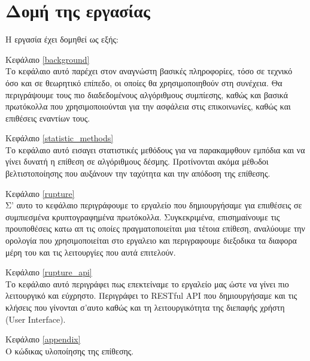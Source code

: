 \section{Δομή της εργασίας}\label{sec:structure}

Η εργασία έχει δομηθεί ως εξής:

 
\begin{description} \item{Κεφάλαιο \ref{background}} \hfill \\

Το κεφάλαιο αυτό παρέχει στον αναγνώστη βασικές πληροφορίες, τόσο σε τεχνικό όσο
και σε θεωρητικό επίπεδο, οι οποίες θα χρησιμοποιηθούν στη συνέχεια.
Θα περιγράψουμε τους πιο διαδεδομένους αλγόριθμους συμπίεσης, καθώς και βασικά
πρωτόκολλα που χρησιμοποιούνται για την ασφάλεια στις επικοινωνίες, καθώς και
επιθέσεις εναντίων τους.\hfill \\

\item{Κεφάλαιο \ref{statistic_methods}} \hfill \\
 
Το κεφάλαιο αυτό εισαγει στατιστικές μεθόδους για να παρακαμφθουν εμπόδια
και να γίνει δυνατή η επίθεση σε αλγόριθμους δέσμης. Προτίνονται ακόμα μέθoδοι
βελτιστοποίησης που αυξάνουν την ταχύτητα και την απόδοση της επίθεσης.


\item{Κεφάλαιο \ref{rupture}} \hfill \\

Σ' αυτο το κεφάλαιο περιγράφουμε το εργαλείο που δημιουργήσαμε για επιιθέσεις
σε συμπιεσμένα κρυπτογραφημένα πρωτόκολλα. Συγκεκριμένα, επισημαίνουμε τις
προυποθέσεις κατω απ τις οποίες πραγματοποιείται μια τέτοια επίθεση, αναλύουμε
την ορολογία που χρησιμοποιείται στο εργαλειο και περιγραφουμε διεξοδικα τα
διαφορα μέρη του και τις λειτουργίες που αυτά επιτελούν.


\item{Κεφάλαιο \ref{rupture_api}} \hfill \\

Το κεφάλαιο αυτό περιγράφει πως επεκτείναμε το εργαλείο μας ώστε να γίνει πιο
λειτουργικό και εύχρηστο. Περιγράφει το RESTful API που δημιουργήσαμε και τις
κλήσεις που γίνονται σ'αυτο καθώς και τη λειτουργικότητα της διεπαφής χρήστη
(User Interface).


\item{Κεφάλαιο \ref{appendix}} \hfill \\

Ο κώδικας υλοποίησης της επίθεσης.  

\end{description}

